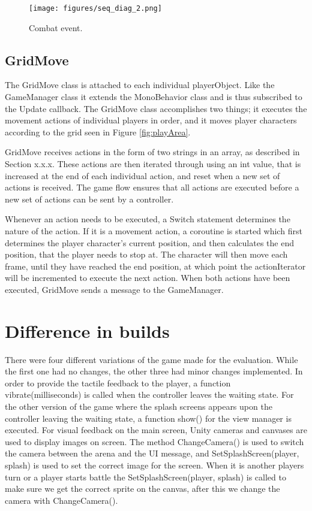\begin{figure}
	\centering
	\texttt{[image: figures/seq\_diag\_2.png]}
	\caption{Combat event. \label{fig:seqDiag3}}
\end{figure}

\subsection{GridMove}
The GridMove class is attached to each individual playerObject. Like the GameManager class it extends the MonoBehavior class and is thus subscribed to the Update callback. The GridMove class accomplishes two things; it executes the movement actions of individual players in order, and it moves player characters according to the grid seen in Figure \ref{fig:playArea}. 


GridMove receives actions in the form of two strings in an array, as described in Section x.x.x. These actions are then iterated through using an int value, that is increased at the end of each individual action, and reset when a new set of actions is received. The game flow ensures that all actions are executed before a new set of actions can be sent by a controller. 


Whenever an action needs to be executed, a Switch statement determines the nature of the action. If it is a movement action, a coroutine is started which first determines the player character’s current position, and then calculates the end position, that the player needs to stop at. The character will then move each frame, until they have reached the end position, at which point the actionIterator will be incremented to execute the next action. When both actions have been executed, GridMove sends a message to the GameManager.

\section{Difference in builds}
There were four different variations of the game made for the evaluation. While the first one had no changes, the other three had minor changes implemented. In order to provide the tactile feedback to the player, a function vibrate(milliseconds) is called when the controller leaves the waiting state. For the other version of the game where the splash screens appears upon the controller leaving the waiting state, a function show() for the view manager is executed. For visual feedback on the main screen, Unity cameras and canvases are used to display images on screen. The method ChangeCamera() is used to switch the camera between the arena and the UI message, and  SetSplashScreen(player, splash) is used to set the correct image for the screen. When it is another players turn or a player starts battle the SetSplashScreen(player, splash) is called to make sure we get the correct sprite on the canvas, after this we change the camera with ChangeCamera(). 

